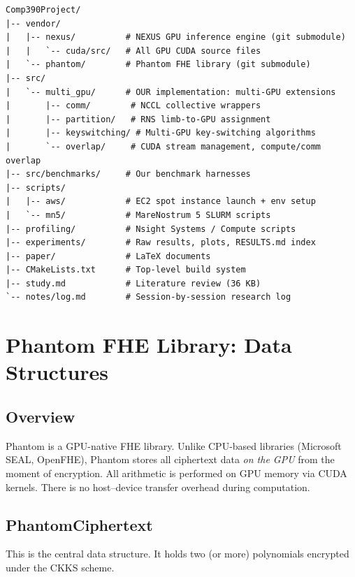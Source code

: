 \documentclass[11pt,letterpaper]{article}
\begin{document}
\begin{lstlisting}[style=bash, caption=Top-level directory layout]
Comp390Project/
|-- vendor/
|   |-- nexus/          # NEXUS GPU inference engine (git submodule)
|   |   `-- cuda/src/   # All GPU CUDA source files
|   `-- phantom/        # Phantom FHE library (git submodule)
|-- src/
|   `-- multi_gpu/      # OUR implementation: multi-GPU extensions
|       |-- comm/        # NCCL collective wrappers
|       |-- partition/   # RNS limb-to-GPU assignment
|       |-- keyswitching/ # Multi-GPU key-switching algorithms
|       `-- overlap/     # CUDA stream management, compute/comm overlap
|-- src/benchmarks/     # Our benchmark harnesses
|-- scripts/
|   |-- aws/            # EC2 spot instance launch + env setup
|   `-- mn5/            # MareNostrum 5 SLURM scripts
|-- profiling/          # Nsight Systems / Compute scripts
|-- experiments/        # Raw results, plots, RESULTS.md index
|-- paper/              # LaTeX documents
|-- CMakeLists.txt      # Top-level build system
|-- study.md            # Literature review (36 KB)
`-- notes/log.md        # Session-by-session research log
\end{lstlisting}

\section{Phantom FHE Library: Data Structures}
\label{sec:phantom-data}

\subsection{Overview}

Phantom is a GPU-native FHE library. Unlike CPU-based libraries (Microsoft SEAL,
OpenFHE), Phantom stores all ciphertext data \emph{on the GPU} from the moment of
encryption. All arithmetic is performed on GPU memory via CUDA kernels. There is no
host--device transfer overhead during computation.

\subsection{PhantomCiphertext}

This is the central data structure. It holds two (or more) polynomials encrypted under
the CKKS scheme.
\end{document}
